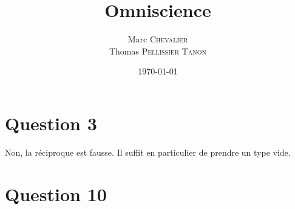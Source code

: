 

\author{
    Marc \textsc{Chevalier}\\
    Thomas \textsc{Pellissier Tanon}
}
\date{\today}
\title{Omniscience}


\maketitle

\section*{Question 3}

Non, la réciproque est fausse. Il suffit en particulier de prendre un type vide.

\section*{Question 10}

